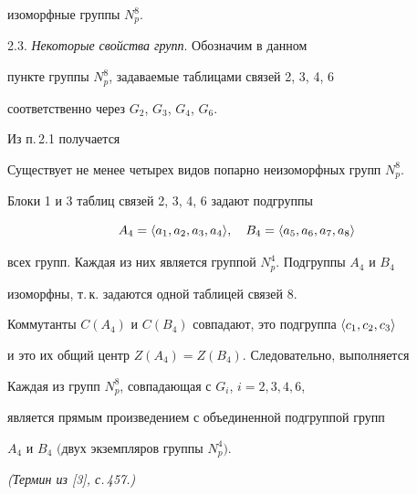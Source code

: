 изоморфные группы $N^8_p$.


\medskip





2.3. {\it Некоторые свойства групп}. Обозначим в данном


пункте группы $N^8_p$, задаваемые таблицами связей 2, 3, 4, 6 


соответственно через $G_2$, $G_3$, $G_4$, $G_6$.





Из п.\,2.1 получается








\begin{thm}


Существует не менее четырех видов попарно неизоморфных групп $N^8_p$.


\end{thm}





Блоки 1 и 3 таблиц связей 2, 3, 4, 6 задают подгруппы


$$


A_4=\la a_1,a_2,a_3,a_4 \ra,\quad


B_4=\la a_5,a_6,a_7,a_8\ra


$$


всех групп. Каждая из них является группой $N^4_p$. Подгруппы $A_4$ и $B_4$


изоморфны, т.\,к. задаются одной таблицей связей 8.





Коммутанты $C(A_4)$ и $C(B_4)$ совпадают, это подгруппа $\langle c_1,c_2,c_3\rangle$


и это их общий центр $Z(A_4)=Z(B_4)$. Следовательно, выполняется








\begin{thm}


Каждая из групп $N^8_p$, совпадающая с $G_i$, $i=2,3,4,6$,


является прямым произведением с объединенной подгруппой групп


$A_4$ и $B_4$ $($двух экземпляров группы $N^4_p)$.


{\em (Термин из [3], с.\,457.)}


\end{thm}






